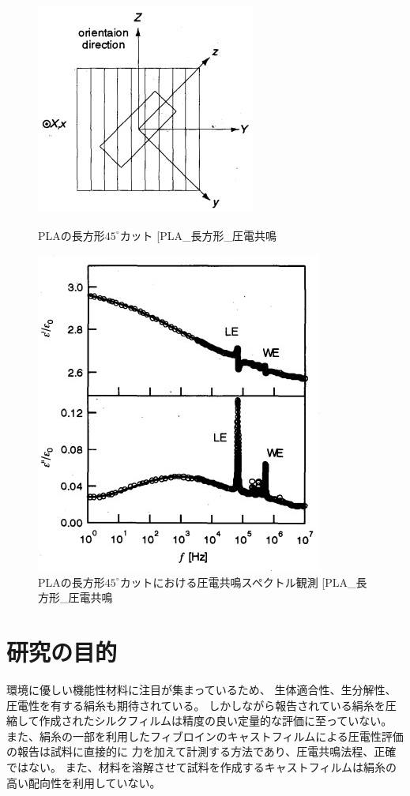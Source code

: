 \documentclass[dvipdfmx,12pt,a4paper]{jreport}
\makeatletter
\DeclareRobustCommand\cite{\unskip
    	\@ifnextchar[{\@tempswatrue\@citex}{\@tempswafalse\@citex[]}}
\makeatother
\begin{document}
			\begin{figure}[h]
				\centering
				\begin{minipage}{0.45\hsize}
					\centering
					\includegraphics{PLA_ずり圧電_長方形カット.jpg}
					\caption{PLAの長方形$45^\circ$カット\cite{PLA_長方形_圧電共鳴}}
					\label{PLA_45_cut}
				\end{minipage}
				\begin{minipage}{0.45\hsize}
					\centering
					\includegraphics{PLA_圧電共鳴スペクトル_長方形.jpg}
					\caption{PLAの長方形$45^{\circ}$カットにおける圧電共鳴スペクトル観測\cite{PLA_長方形_圧電共鳴}}
				\end{minipage}
			\end{figure}
		\section{研究の目的}
		環境に優しい機能性材料に注目が集まっているため、
		生体適合性、生分解性、圧電性を有する絹糸も期待されている。
		しかしながら報告されている絹糸を圧縮して作成されたシルクフィルムは精度の良い定量的な評価に至っていない。
		また、絹糸の一部を利用したフィブロインのキャストフィルムによる圧電性評価の報告は試料に直接的に
		力を加えて計測する方法であり、圧電共鳴法程、正確ではない。
		また、材料を溶解させて試料を作成するキャストフィルムは絹糸の高い配向性を利用していない。
		
\end{document}
